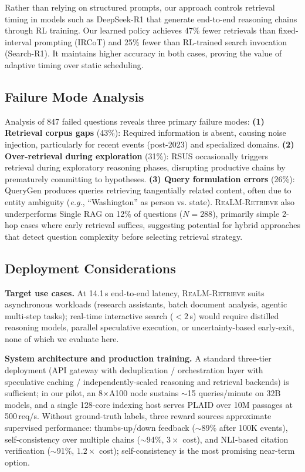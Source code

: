 \documentclass[sigconf,natbib=true]{acmart}
\newcommand{\methodname}{\textsc{ReaLM-Retrieve}}
\newcommand{\eg}{\textit{e.g.}}
\begin{document}
Rather than relying on structured prompts, our approach controls retrieval timing in models such as DeepSeek-R1 that generate end-to-end reasoning chains through RL training. Our learned policy achieves 47\% fewer retrievals than fixed-interval prompting (IRCoT) and 25\% fewer than RL-trained search invocation (Search-R1). It maintains higher accuracy in both cases, proving the value of adaptive timing over static scheduling.

\subsection{Failure Mode Analysis}
Analysis of 847 failed questions reveals three primary failure modes: \textbf{(1) Retrieval corpus gaps} (43\%): Required information is absent, causing noise injection, particularly for recent events (post-2023) and specialized domains. \textbf{(2) Over-retrieval during exploration} (31\%): RSUS occasionally triggers retrieval during exploratory reasoning phases, disrupting productive chains by prematurely committing to hypotheses. \textbf{(3) Query formulation errors} (26\%): QueryGen produces queries retrieving tangentially related content, often due to entity ambiguity (\eg, ``Washington'' as person vs. state). \methodname{} also underperforms Single RAG on 12\% of questions ($N=288$), primarily simple 2-hop cases where early retrieval suffices, suggesting potential for hybrid approaches that detect question complexity before selecting retrieval strategy.

\subsection{Deployment Considerations}
\textbf{Target use cases.} At 14.1\,s end-to-end latency, \methodname{} suits asynchronous workloads (research assistants, batch document analysis, agentic multi-step tasks); real-time interactive search ($<2$\,s) would require distilled reasoning models, parallel speculative execution, or uncertainty-based early-exit, none of which we evaluate here.

\textbf{System architecture and production training.} A standard three-tier deployment (API gateway with deduplication / orchestration layer with speculative caching / independently-scaled reasoning and retrieval backends) is sufficient; in our pilot, an 8$\times$A100 node sustains $\sim$15 queries/minute on 32B models, and a single 128-core indexing host serves PLAID over 10M passages at 500\,req/s. Without ground-truth labels, three reward sources approximate supervised performance: thumbs-up/down feedback ($\sim$89\% after 100K events), self-consistency over multiple chains ($\sim$94\%, $3\times$ cost), and NLI-based citation verification ($\sim$91\%, $1.2\times$ cost); self-consistency is the most promising near-term option.
\end{document}
